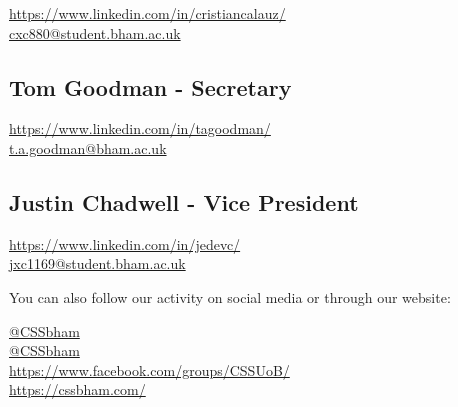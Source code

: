 \documentclass{article}
\begin{document}
\noindent\hspace{1pt}\faLinkedin \hspace{3.5pt} \url{https://www.linkedin.com/in/cristiancalauz/} \\
\faEnvelope \hspace{0.1cm} \href{mailto:cxc880@student.bham.ac.uk}{cxc880@student.bham.ac.uk}

\subsection*{Tom Goodman - Secretary}

\noindent\hspace{1pt}\faLinkedin \hspace{3.5pt} \url{https://www.linkedin.com/in/tagoodman/} \\
\faEnvelope \hspace{0.1cm} \href{mailto:t.a.goodman@bham.ac.uk}{t.a.goodman@bham.ac.uk}

\subsection*{Justin Chadwell - Vice President}

\noindent\hspace{1pt}\faLinkedin \hspace{3.5pt} \url{https://www.linkedin.com/in/jedevc/} \\
\faEnvelope \hspace{0.1cm} \href{mailto:jxc1169@student.bham.ac.uk}{jxc1169@student.bham.ac.uk}

\vspace{1cm}

\noindent You can also follow our activity on social media or through our website:
\medskip

\noindent \faTwitter  \hspace{0.1cm} \href{https://twitter.com/cssbham}{@CSSbham} \\
\faInstagram  \hspace{0.1cm} \href{https://www.instagram.com/cssbham/}{@CSSbham} \\
\faFacebook  \hspace{0.3cm} \url{https://www.facebook.com/groups/CSSUoB/} \\
\faMousePointer  \hspace{0.225cm} \url{https://cssbham.com/}
\end{document}
